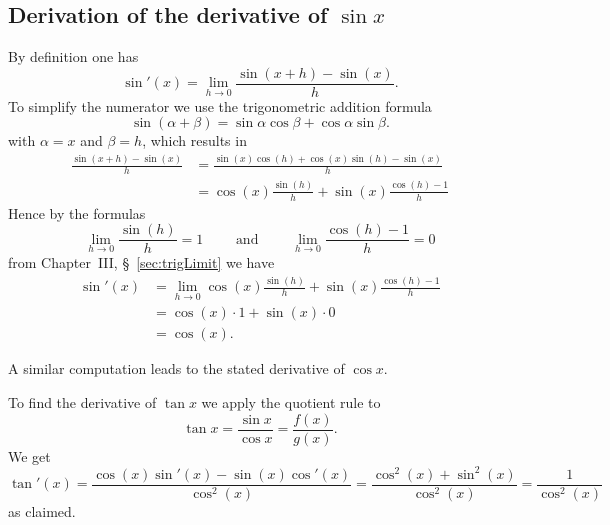 \subsection{Derivation of the derivative of $\sin x$}
\label{sec:deriv-deriv-sin}
By definition one has
\begin{equation}\label{eq:derivation-of-deriv-of-sine}
  \sin'(x)=\lim_{h\to 0}\frac{\sin(x+ h)-\sin(x)}{h} .
\end{equation}
To simplify the numerator we use the trigonometric addition formula
\[
\sin(\alpha+\beta) = \sin\alpha\cos\beta+\cos\alpha\sin\beta.
\]
with $\alpha=x$ and $\beta=h$, which results in
\begin{align*}
  \frac{\sin(x+ h)-\sin(x)}{h} &=
  \frac{\sin(x)\cos(h)+\cos(x)\sin(h)-\sin(x)}{h}\\
  &= \cos(x)\frac{\sin(h)}{h}+\sin(x)\frac{\cos(h)-1}{h}
\end{align*}
Hence by the formulas
\[
\lim_{h\to 0}\frac{\sin(h)}{h} = 1 \qquad\mbox{ and }\qquad
\lim_{h\to 0}\frac{\cos (h)-1}{h} = 0
\]
from Chapter~III, \S~\ref{sec:trigLimit} we have
\begin{align*}
  \sin'(x)
  &= \lim_{h\to 0} \cos(x)\frac{\sin(h)}{h}+\sin(x)\frac{\cos(h)-1}{h}\\
  &= \cos(x) \cdot 1 + \sin(x) \cdot 0\\
  &= \cos(x).
\end{align*}

A similar computation leads to the stated derivative of $\cos x$.

To find the derivative of $\tan x$ we apply the quotient rule to
\[
\tan x=\frac{\sin x}{\cos x} = \frac{f(x)}{g(x)}.
\]
We get
\[
\tan'(x)=\frac{\cos(x)\sin'(x) - \sin(x) \cos'(x)}{\cos^2(x)}
=\frac{\cos^2(x)+\sin^2(x)}{\cos^2(x)} =\frac{1}{\cos^2(x)}
\]
as claimed.


